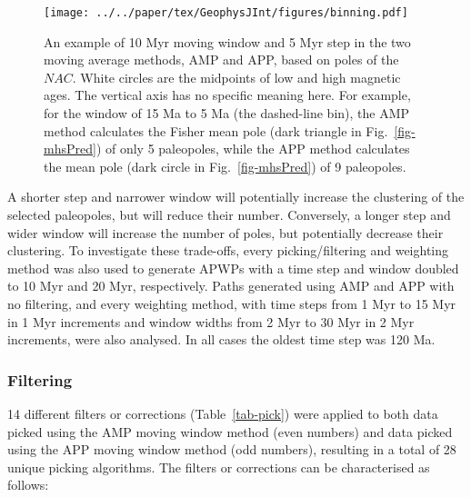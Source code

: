 \begin{figure}
\centering
\texttt{[image: ../../paper/tex/GeophysJInt/figures/binning.pdf]}
\caption[How moving average (MA) methods work]{An example of 10 Myr moving
window and 5 Myr step in the two moving average methods, AMP and APP, based on
poles of the $NAC$. White circles are the midpoints of low and high magnetic
ages. The vertical axis has no specific meaning here. For example, for the
window of 15 Ma to 5 Ma (the dashed-line bin), the AMP method calculates the
Fisher mean pole (dark triangle in Fig.~\ref{fig-mhsPred}) of only 5 paleopoles,
while the APP method calculates the mean pole (dark circle in
Fig.~\ref{fig-mhsPred}) of 9 paleopoles.}\label{fig-nac-maplat}
\end{figure}

A shorter step and narrower window will potentially increase the clustering of
the selected paleopoles, but will reduce their number. Conversely, a longer step
and wider window will increase the number of poles, but potentially decrease
their clustering. To investigate these trade-offs, every picking/filtering and
weighting method was also used to generate APWPs with a time step and window
doubled to 10 Myr and 20 Myr, respectively. Paths generated using AMP and APP
with no filtering, and every weighting method, with time steps from 1 Myr to 15
Myr in 1 Myr increments and window widths from 2 Myr to 30 Myr in 2 Myr
increments, were also analysed. In all cases the oldest time step was 120 Ma.

\subsubsection{Filtering}\label{sec:f}

14 different filters or corrections (Table~\ref{tab-pick}) were applied to both
data picked using the AMP moving window method (even numbers) and data picked
using the APP moving window method (odd numbers), resulting in a total of 28
unique picking algorithms. The filters or corrections can be characterised as
follows:

